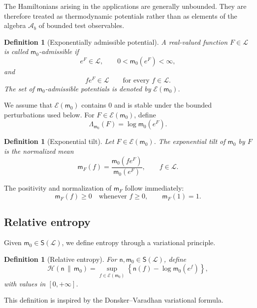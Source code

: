 \documentclass[10pt,a4paper]{amsart}
\newtheorem{Definition}[Theorem]{Definition}
\begin{document}
The Hamiltonians arising in the applications are generally unbounded.
They are therefore treated as thermodynamic potentials rather than as
elements of the algebra $\mathcal A_b$ of bounded test observables.

\begin{Definition}[Exponentially admissible potential]
\label{def:admissible-potential}
A real-valued function $F\in\mathcal L$ is called
\emph{$\mathsf m_0$-admissible} if
\[
e^F\in\mathcal L,
\qquad
0<\mathsf m_0(e^F)<\infty,
\]
and
\[
fe^F\in\mathcal L
\qquad
\text{for every }f\in\mathcal L.
\]
The set of $\mathsf m_0$-admissible potentials is denoted by
$\mathcal E(\mathsf m_0)$.
\end{Definition}

We assume that $\mathcal E(\mathsf m_0)$ contains $0$ and is stable
under the bounded perturbations used below. For
$F\in\mathcal E(\mathsf m_0)$, define
\[
\Lambda_{\mathsf m_0}(F)
=
\log\mathsf m_0(e^F).
\]

\begin{Definition}[Exponential tilt]
\label{def:exponential-tilt}
Let $F\in\mathcal E(\mathsf m_0)$. The exponential tilt of
$\mathsf m_0$ by $F$ is the normalized mean
\[
\mathsf m_F(f)
=
\frac{\mathsf m_0(fe^F)}{\mathsf m_0(e^F)},
\qquad
f\in\mathcal L.
\]
\end{Definition}

The positivity and normalization of $\mathsf m_F$ follow immediately:
\[
\mathsf m_F(f)\geq 0
\quad\text{whenever }f\geq 0,
\qquad
\mathsf m_F(1)=1.
\]

\subsection{Relative entropy}

Given $\mathsf m_0\in\mathsf S(\mathcal L)$, we define entropy through a
variational principle.

\begin{Definition}[Relative entropy]
\label{def:entropy}
For $\mathsf n,\mathsf m_0\in\mathsf S(\mathcal L)$, define
\[
\mathcal H(\mathsf n\,\|\,\mathsf m_0)
=
\sup_{f\in\mathcal E(\mathsf m_0)}
\left\{
\mathsf n(f)-\log\mathsf m_0(e^f)
\right\},
\]
with values in $[0,+\infty]$.
\end{Definition}

This definition is inspired by the Donsker--Varadhan variational
formula.
\end{document}
